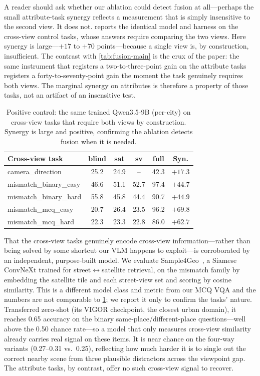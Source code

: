 \documentclass[runningheads]{llncs}
\begin{document}
A reader should ask whether our ablation could detect fusion at all---perhaps the
small attribute-task synergy reflects a measurement that is simply insensitive to
the second view. It does not.  reports the identical model and
harness on the cross-view control tasks, whose answers require comparing the two
views. Here synergy is large---$+\num{17}$ to $+\num{70}$ points---because a single
view is, by construction, insufficient. The contrast with \cref{tab:fusion-main}
is the crux of the paper: the same instrument that registers a two-to-three-point
gain on the attribute tasks registers a forty-to-seventy-point gain the moment the
task genuinely requires both views. The marginal synergy on attributes is
therefore a property of those tasks, not an artifact of an insensitive test.

\begin{table}[t]
  \centering
  \caption{Positive control: the same trained Qwen3.5-9B (per-city) on cross-view
  tasks that require both views by construction. Synergy is large and positive,
  confirming the ablation detects fusion when it is needed.}
  \label{tab:control}
  \setlength{\tabcolsep}{5pt}
  \begin{tabular}{@{}lccccc@{}}
    \toprule
    Cross-view task & blind & sat & sv & full & Syn. \\
    \midrule
    camera\_direction      & 25.2 & 24.9 & --   & 42.3 & $+17.3$ \\
    mismatch\_binary\_easy & 46.6 & 51.1 & 52.7 & 97.4 & $+44.7$ \\
    mismatch\_binary\_hard & 55.8 & 45.8 & 44.4 & 90.7 & $+44.9$ \\
    mismatch\_mcq\_easy    & 20.7 & 26.4 & 23.5 & 96.2 & $+69.8$ \\
    mismatch\_mcq\_hard    & 22.3 & 23.3 & 22.8 & 86.0 & $+62.7$ \\
    \bottomrule
  \end{tabular}
\end{table}

That the cross-view tasks genuinely encode cross-view information---rather than
being solved by some shortcut our VLM happens to exploit---is corroborated by an
independent, purpose-built model. We evaluate Sample4Geo~\cite{deuser2023sample4geo},
a Siamese ConvNeXt trained for street$\leftrightarrow$satellite retrieval, on the
mismatch family by embedding the satellite tile and each street-view set and
scoring by cosine similarity. This is a different model class and metric from our
MCQ VQA and the numbers are not comparable to \cref{tab:control}; we report it only
to confirm the tasks' nature. Transferred zero-shot (its VIGOR checkpoint, the
closest urban domain), it reaches \num{0.65} accuracy on the binary
same-place/different-place questions---well above the \num{0.50} chance rate---so a
model that only measures cross-view similarity already carries real signal on these
items. It is near chance on the four-way variants (\num{0.27}--\num{0.31} vs.\
\num{0.25}), reflecting how much harder it is to single out the correct nearby
scene from three plausible distractors across the viewpoint gap. The attribute
tasks, by contrast, offer no such cross-view signal to recover.
\end{document}
